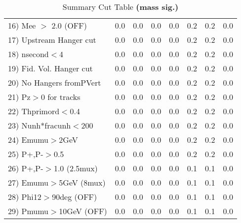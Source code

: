 \begin{table}[h!]
{{\begin{tabular}{||l||r|r|r|r|r||r||r||}
 16) Mee $>$ 2.0  (OFF)   &       0.0 &       0.0 &       0.0 &       0.0 &       0.2 &       0.2 &       0.0 \\
 17) Upstream Hanger cut  &       0.0 &       0.0 &       0.0 &       0.0 &       0.2 &       0.2 &       0.0 \\
 18) nsecond$<$4          &       0.0 &       0.0 &       0.0 &       0.0 &       0.2 &       0.2 &       0.0 \\
 19) Fid. Vol. Hanger cut &       0.0 &       0.0 &       0.0 &       0.0 &       0.2 &       0.2 &       0.0 \\
 20) No Hangers fromPVert &       0.0 &       0.0 &       0.0 &       0.0 &       0.2 &       0.2 &       0.0 \\
 21) Pz$>$0 for tracks    &       0.0 &       0.0 &       0.0 &       0.0 &       0.2 &       0.2 &       0.0 \\
 22) Thprimord$<$0.4      &       0.0 &       0.0 &       0.0 &       0.0 &       0.2 &       0.2 &       0.0 \\
 23) Nunh*fracunh$<$200   &       0.0 &       0.0 &       0.0 &       0.0 &       0.2 &       0.2 &       0.0 \\
 24) Emumu$>$2GeV         &       0.0 &       0.0 &       0.0 &       0.0 &       0.2 &       0.2 &       0.0 \\
 25) P+,P-$>$0.5          &       0.0 &       0.0 &       0.0 &       0.0 &       0.2 &       0.2 &       0.0 \\
 26) P+,P-$>$1.0 (2.5mux) &       0.0 &       0.0 &       0.0 &       0.0 &       0.1 &       0.1 &       0.0 \\
 27) Emumu$>$5GeV  (8mux) &       0.0 &       0.0 &       0.0 &       0.0 &       0.1 &       0.1 &       0.0 \\
 28) Phi12$>$90deg  (OFF) &       0.0 &       0.0 &       0.0 &       0.0 &       0.1 &       0.1 &       0.0 \\
 29) Pmumu$>$10GeV  (OFF) &       0.0 &       0.0 &       0.0 &       0.0 &       0.1 &       0.1 &       0.0 \\
 \hline
 \hline
 \end{tabular}
 \caption{Summary Cut Table \textbf{ (mass sig.) }}
 \label{tab-sumcut}
 }}
 \end{table}
 \endinput
